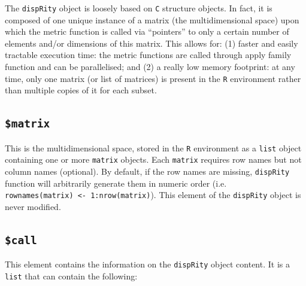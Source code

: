 \documentclass[]{book}
\begin{document}
The \texttt{dispRity} object is loosely based on \texttt{C} structure objects.
In fact, it is composed of one unique instance of a matrix (the multidimensional space) upon which the metric function is called via ``pointers'' to only a certain number of elements and/or dimensions of this matrix.
This allows for: (1) faster and easily tractable execution time: the metric functions are called through apply family function and can be parallelised; and (2) a really low memory footprint: at any time, only one matrix (or list of matrices) is present in the \texttt{R} environment rather than multiple copies of it for each subset.

\hypertarget{matrix}{%
\subsection{\texorpdfstring{\texttt{\$matrix}}{\$matrix}}\label{matrix}}

This is the multidimensional space, stored in the \texttt{R} environment as a \texttt{list} object containing one or more \texttt{matrix} objects.
Each \texttt{matrix} requires row names but not column names (optional).
By default, if the row names are missing, \texttt{dispRity} function will arbitrarily generate them in numeric order (i.e. \texttt{rownames(matrix)\ \textless{}-\ 1:nrow(matrix)}).
This element of the \texttt{dispRity} object is never modified.

\hypertarget{call}{%
\subsection{\texorpdfstring{\texttt{\$call}}{\$call}}\label{call}}

This element contains the information on the \texttt{dispRity} object content.
It is a \texttt{list} that can contain the following:
\end{document}
